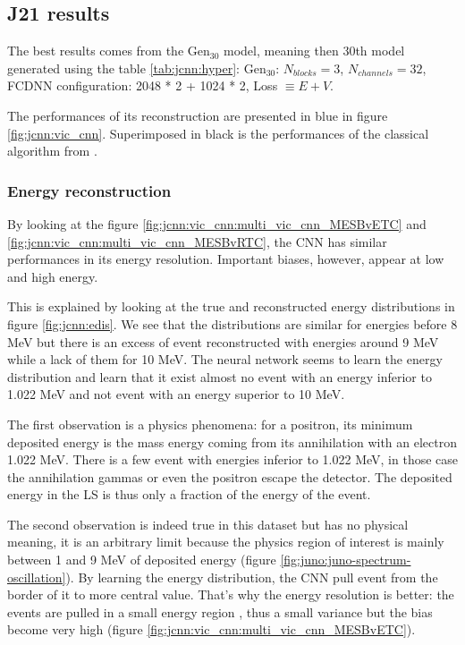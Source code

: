 \documentclass[../main.tex]{subfiles}
\begin{document}
\subsection{J21 results}

The best results comes from the $\mathrm{Gen}_{30}$ model, meaning then 30th model generated using the table \ref{tab:jcnn:hyper}: $\mathrm{Gen}_{30}$: $N_{blocks} = 3$, $N_{channels} = 32$, FCDNN configuration: 2048 * 2 + 1024 * 2, Loss $\equiv E+V$.

The performances of its reconstruction are presented in blue in figure \ref{fig:jcnn:vic_cnn}. Superimposed in black is the performances of the classical algorithm from \cite{lebrin_towards_2022}.

\subsubsection{Energy reconstruction}

By looking at the figure \ref{fig:jcnn:vic_cnn:multi_vic_cnn_MESBvETC} and \ref{fig:jcnn:vic_cnn:multi_vic_cnn_MESBvRTC}, the CNN has similar performances in its energy resolution. Important biases, however, appear at low and high energy.

This is explained by looking at the true and reconstructed energy distributions in figure \ref{fig:jcnn:edis}. We see that the distributions are similar for energies before 8 MeV but there is an excess of event reconstructed with energies around 9 MeV while a lack of them for 10 MeV. The neural network seems to learn the energy distribution and learn that it exist almost no event with an energy inferior to 1.022 MeV and not event with an energy superior to 10 MeV.

The first observation is a physics phenomena: for a positron, its minimum deposited energy is the mass energy coming from its annihilation with an electron 1.022 MeV. There is a few event with energies inferior to 1.022 MeV, in those case the annihilation gammas or even the positron escape the detector. The deposited energy in the LS is thus only a fraction of the energy of the event.

The second observation is indeed true in this dataset but has no physical meaning, it is an arbitrary limit because the physics region of interest is mainly between 1 and 9 MeV of deposited energy (figure \ref{fig:juno:juno-spectrum-oscillation}). By learning the energy distribution, the CNN pull event from the border of it to more central value. That's why the energy resolution is better: the events are pulled in a small energy region , thus a small variance but the bias become very high (figure \ref{fig:jcnn:vic_cnn:multi_vic_cnn_MESBvETC}).
\end{document}
